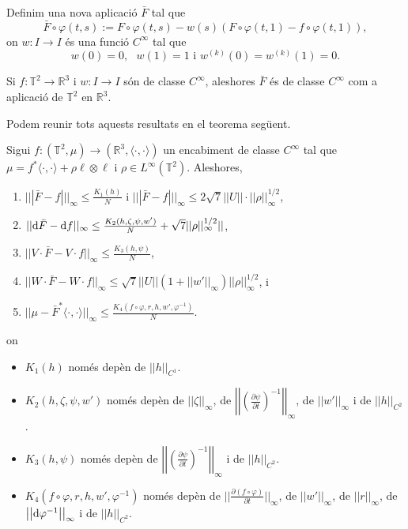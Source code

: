 Definim una nova aplicació $\bar F$ tal que
\begin{equation}
    \bar F\circ\varphi(t,s) := F\circ\varphi(t,s) - w(s)(F\circ\varphi(t,1)-f\circ\varphi(t,1)),
\end{equation}
on $w:I\to I$ és una funció $C^\infty$ tal que 
\begin{equation*}
    w(0)=0, \text{ } w(1)=1 \text{ i } w^{(k)}(0)=w^{(k)}(1)=0.
\end{equation*}
\begin{lema}
    \label{lema:lema8}
    Si $f:\mathbb T^2\to\mathbb R^3$ i $w:I\to I$ són de classe $C^\infty$, aleshores $\bar F$ és de classe $C^\infty$ com a aplicació de $\mathbb T^2$ en $\mathbb R^3$.
\end{lema}
Podem reunir tots aquests resultats en el teorema següent.
\begin{teo}
    Sigui $f:(\mathbb T^2, \mu)\to(\mathbb R^3, \langle\cdot, \cdot\rangle)$ un encabiment de classe $C^\infty$ tal que $\mu = f^*\langle\cdot, \cdot\rangle + \rho\ell\otimes\ell$ i $\rho\in L^\infty(\mathbb T^2)$. Aleshores, 
    \begin{enumerate}
        \item $|||\bar F-f|||_\infty\le\frac{K_1(h)}{N}$ i $|||\bar F-f|||_\infty\le 2\sqrt7||U||\cdot||\rho||^{1/2}_\infty$,
        \item $||\text d\bar F-\text df||_\infty\le\frac{K_2(h,\zeta,\psi,w')}{N} + \sqrt7||\rho||^{1/2}_\infty||$,
        \item $||V\cdot\bar F-V\cdot f||_\infty\le\frac{K_3(h,\psi)}{N}$,
        \item $||W\cdot\bar F-W\cdot f||_\infty\le\sqrt7||U||(1+||w'||_\infty)||\rho||^{1/2}_\infty$, i
        \item $||\mu - \bar F^*\langle\cdot, \cdot\rangle||_\infty\le\frac{K_4(f\circ\varphi,r,h,w',\varphi^{-1})}{N}$.
    \end{enumerate}
    on 
    \begin{itemize}
        \item $K_1(h)$ només depèn de $||h||_{C^1}$.
        \item $K_2(h,\zeta,\psi,w')$ només depèn de $||\zeta||_\infty$, de $\left|\left|\left(  \frac{\partial\psi}{\partial t}\right)^{-1}\right|\right|_\infty$, de $||w'||_\infty$ i de $||h||_{C^2}$.
        \item $K_3(h,\psi)$ només depèn de $\left|\left|\left(  \frac{\partial\psi}{\partial t}\right)^{-1}\right|\right|_\infty$ i de $||h||_{C^2}$.
        \item $K_4(f\circ\varphi,r,h,w',\varphi^{-1})$ només depèn de $||\frac{\partial(f\circ\varphi)}{\partial t}||_\infty$, de $||w'||_\infty$, de $||r||_\infty$, de $\left|\left|\text d\varphi^{-1}\right|\right|_\infty$ i de $||h||_{C^2}$.
    \end{itemize}
\end{teo}
